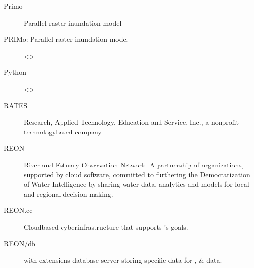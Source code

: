 \documentclass[letterpaper,10pt,english]{sphinxmanual}
\begin{document}
\begin{description}
\item[{Primo\label{\detokenize{glossary:term-Primo}}}] \leavevmode
\sphinxAtStartPar
Parallel raster inundation model

\item[{PRIMo: Parallel raster inundation model\label{\detokenize{glossary:term-PRIMo-Parallel-raster-inundation-model}}}] \leavevmode
\sphinxAtStartPar
\textless{}\textgreater{}

\item[{Python\label{\detokenize{glossary:term-Python}}}] \leavevmode
\sphinxAtStartPar
\textless{}\textgreater{}

\item[{RATES\label{\detokenize{glossary:term-RATES}}}] \leavevmode
\sphinxAtStartPar
Research, Applied Technology, Education and Service, Inc., a non\sphinxhyphen{}profit technology\sphinxhyphen{}based company.

\item[{REON\label{\detokenize{glossary:term-REON}}}] \leavevmode
\sphinxAtStartPar
River and Estuary Observation Network. A partnership of organizations, supported by cloud software, committed to furthering the Democratization of Water Intelligence by sharing water data, analytics and models for local and regional decision making.

\item[{REON.cc\label{\detokenize{glossary:term-REON.cc}}}] \leavevmode
\sphinxAtStartPar
Cloud\sphinxhyphen{}based cyber\sphinxhyphen{}infrastructure that supports {\hyperref[\detokenize{glossary:term-REON}]{}}’s goals.

\item[{REON/db\label{\detokenize{glossary:term-REON-db}}}] \leavevmode
\sphinxAtStartPar
{\hyperref[\detokenize{glossary:term-PostgreSQL}]{}} with {\hyperref[\detokenize{glossary:term-PostGIS}]{}} extensions database server storing {\hyperref[\detokenize{glossary:term-REON}]{}} specific data for {\hyperref[\detokenize{glossary:term-RTHS}]{}}, {\hyperref[\detokenize{glossary:term-REON-WM}]{}} \& {\hyperref[\detokenize{glossary:term-REON.cc}]{}} data.


\end{description}
\end{document}
